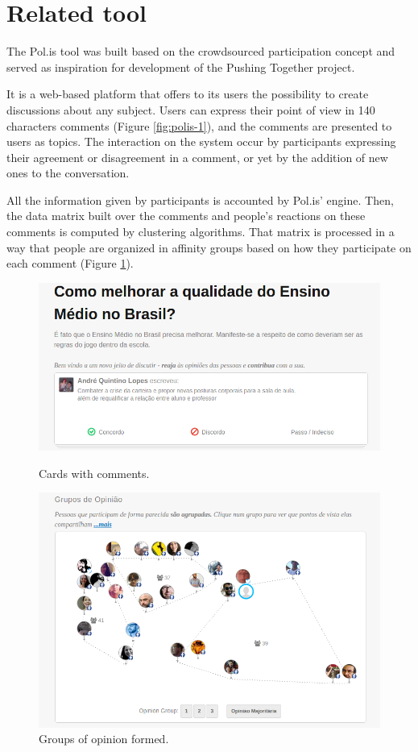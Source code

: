 \documentclass{llncs}
\begin{document}
\section{Related tool}

  The Pol.is tool was built based on
the crowdsourced participation concept and served as inspiration for
development of the Pushing Together project.

  It is a web-based platform that offers to its users the possibility to
create discussions about any subject. Users can express their point of view in
140 characters comments (Figure \ref{fig:polis-1}), and the comments are presented
to users as topics. The interaction on the system occur by
participants expressing their agreement or disagreement in a comment, or yet by
the addition of new ones to the conversation.

  All the information given by participants is accounted by Pol.is' engine.
Then, the data matrix built over the comments and people's reactions on these
comments is computed by clustering algorithms. That matrix is processed in
a way that people are organized in affinity groups based on how they participate
on each comment (Figure \ref{fig:polis-2}).

 \begin{figure}[hbt]
   \centering
   \begin{minipage}{.50\textwidth}
     \includegraphics[width=.9\linewidth]{images/polis1.png}
     \caption{Cards with comments.}
     \label{fig:polis-1}
   \end{minipage}
   \begin{minipage}{.49\textwidth}
     \includegraphics[width=.9\linewidth]{images/polis2.png}
     \caption{Groups of opinion formed.}
     \label{fig:polis-2}
   \end{minipage}
 \end{figure}
\end{document}

